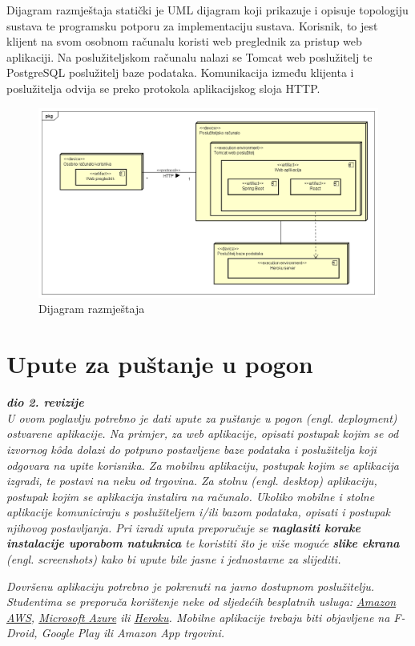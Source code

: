 			Dijagram razmještaja statički je UML dijagram koji prikazuje i opisuje topologiju sustava te programsku potporu za implementaciju sustava. Korisnik, to jest klijent na svom osobnom računalu koristi web preglednik za pristup web aplikaciji. Na poslužiteljskom računalu nalazi se Tomcat web poslužitelj te PostgreSQL poslužitelj baze podataka. Komunikacija između klijenta i poslužitelja odvija se preko protokola aplikacijskog sloja HTTP.
			
			\begin{figure}[H]
				\includegraphics[scale=0.4]{dijagrami/dijagramRazmjestaja1} %
				\centering
				\caption{Dijagram razmještaja}
				\label{fig:dijagramRazmjestaja}
			\end{figure}
			
			 
			\eject 
		
		\section{Upute za puštanje u pogon}
		
			\textbf{\textit{dio 2. revizije}}\\
		
			 \textit{U ovom poglavlju potrebno je dati upute za puštanje u pogon (engl. deployment) ostvarene aplikacije. Na primjer, za web aplikacije, opisati postupak kojim se od izvornog kôda dolazi do potpuno postavljene baze podataka i poslužitelja koji odgovara na upite korisnika. Za mobilnu aplikaciju, postupak kojim se aplikacija izgradi, te postavi na neku od trgovina. Za stolnu (engl. desktop) aplikaciju, postupak kojim se aplikacija instalira na računalo. Ukoliko mobilne i stolne aplikacije komuniciraju s poslužiteljem i/ili bazom podataka, opisati i postupak njihovog postavljanja. Pri izradi uputa preporučuje se \textbf{naglasiti korake instalacije uporabom natuknica} te koristiti što je više moguće \textbf{slike ekrana} (engl. screenshots) kako bi upute bile jasne i jednostavne za slijediti.}
			
			
			 \textit{Dovršenu aplikaciju potrebno je pokrenuti na javno dostupnom poslužitelju. Studentima se preporuča korištenje neke od sljedećih besplatnih usluga: \href{https://aws.amazon.com/}{Amazon AWS}, \href{https://azure.microsoft.com/en-us/}{Microsoft Azure} ili \href{https://www.heroku.com/}{Heroku}. Mobilne aplikacije trebaju biti objavljene na F-Droid, Google Play ili Amazon App trgovini.}
			
			
			\eject 
